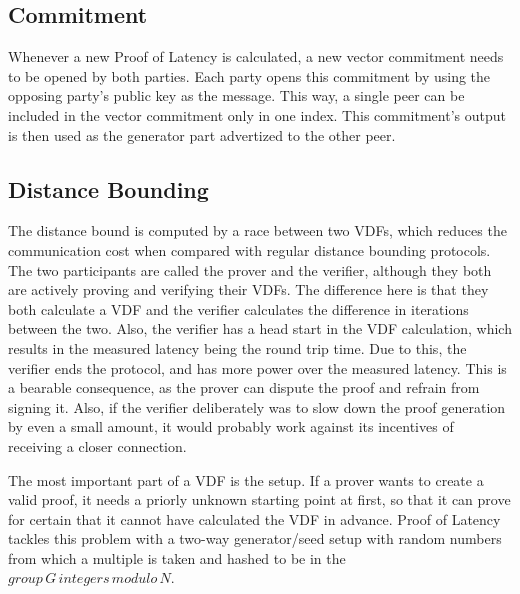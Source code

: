 \subsection{Commitment}
Whenever a new Proof of Latency is calculated, a new vector commitment needs to be opened by both parties. Each party opens this commitment by using the opposing party's public key as the message. This way, a single peer can be included in the vector commitment only in one index. This commitment's output is then used as the generator part advertized to the other peer.

\subsection{Distance Bounding}
The distance bound is computed by a race between two VDFs, which reduces the communication cost when compared with regular distance bounding protocols. The two participants are called the prover and the verifier, although they both are actively proving and verifying their VDFs. The difference here is that they both calculate a VDF and the verifier calculates the difference in iterations between the two. Also, the verifier has a head start in the VDF calculation, which results in the measured latency being the round trip time. Due to this, the verifier ends the protocol, and has more power over the measured latency. This is a bearable consequence, as the prover can dispute the proof and refrain from signing it. Also, if the verifier deliberately was to slow down the proof generation by even a small amount, it would probably work against its incentives of receiving a closer connection.

The most important part of a VDF is the setup. If a prover wants to create a valid proof, it needs a priorly unknown starting point at first, so that it can prove for certain that it cannot have calculated the VDF in advance. Proof of Latency tackles this problem with a two-way generator/seed setup with random numbers from which a multiple is taken and hashed to be in the \(group\, G\, integers\, modulo\, N\).

